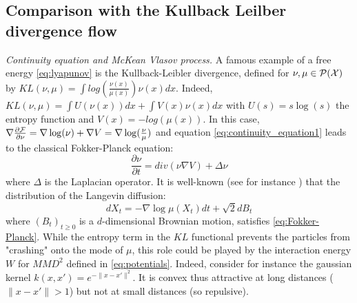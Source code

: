 \subsection{Comparison with the Kullback Leilber divergence flow}\label{subsec:kl_flow}



\textit{Continuity equation and McKean Vlasov process.}	A famous example of a free energy \eqref{eq:lyapunov} is the Kullback-Leibler divergence, defined for $\nu, \mu \in \mathcal{P}({{\mathcal X}})$ by
	$KL(\nu,\mu)=\int log(\frac{\nu(x)}{\mu(x)})\nu(x)dx$. Indeed, $KL(\nu, \mu)=\int U(\nu(x))dx + \int V(x) \nu(x)dx$ with $U(s)=s\log(s)$ the entropy function and $V(x)=-log(\mu(x))$. In this case, $\nabla \frac{\partial {{\mathcal F}}}{\partial \nu}= \nabla \log(\nu) + \nabla V=  \nabla \log(\frac{\nu}{\mu})$ and equation \eqref{eq:continuity_equation1} leads to the classical Fokker-Planck equation:
	\begin{equation}\label{eq:Fokker-Planck}
	\frac{\partial{\nu}}{\partial t}= div(\nu \nabla V )+ \Delta \nu
	\end{equation}
	where $\Delta$ is the Laplacian operator. It is well-known (see for instance \cite{jordan1998variational}) that the distribution of the Langevin diffusion:
	\begin{equation}\label{eq:langevin_diffusion}
	dX_t= -\nabla \log \mu (X_t)dt+\sqrt{2}dB_t
	\end{equation}
	where $(B_t)_{t\ge0}$ is a $d$-dimensional Brownian motion, satisfies \eqref{eq:Fokker-Planck}. While the entropy term in the $KL$ functional prevents the particles from "crashing" onto the mode of $\mu$, this role could be played by the interaction energy $W$ for $MMD^2$ defined in \cref{eq:potentials}. Indeed, consider for instance the gaussian kernel $k(x,x')=e^{-\|x-x'\|^2}$. It is convex thus attractive at long distances ($\|x-x'\|>1$) but not at small distances (so repulsive). %
	
